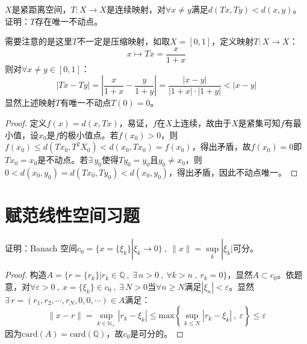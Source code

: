 \begin{example}
\quad $X$是紧距离空间，$T:X \to X$是连续映射，对$\forall x \neq y$满足$d(Tx,Ty)<d(x,y)$。证明：$T$存在唯一不动点。
\end{example}
\begin{remark}
\quad 需要注意的是这里$T$不一定是压缩映射，如取$X=[0,1]$，定义映射$T:X \to X$：
\[x \mapsto Tx=\frac{x}{1+x}\]
则对$\forall x \neq y \in [0,1]$：
\[|Tx-Ty|=\left|\frac{x}{1+x}-\frac{y}{1+y}\right|=\frac{|x-y|}{|1+x|\cdot|1+y|}<|x-y|\]
显然上述映射$T$有唯一不动点$T(0)=0$。
\end{remark}
\begin{proof}
定义$f(x)=d(x,Tx)$，易证，$f$在$X$上连续，故由于$X$是紧集可知$f$有最小值，设$x_0$是$f$的极小值点。若$f(x_0)>0$，则$f(x_0) \leq d(Tx_0,T^2X_0)<d(x_0,Tx_0)=f(x_0)$，得出矛盾，故$f(x_0)=0$即$Tx_0=x_0$是不动点。若$\exists \, y_0$使得$Ty_0=y_0$且$y_0 \neq x_0$，则$0<d(x_0,y_0)=d(Tx_0,Ty_0)<d(x_0,y_0)$，得出矛盾，因此不动点唯一。
\end{proof}

\section*{赋范线性空间习题}
\begin{example}
\quad 证明：Banach 空间$c_0=\{x=\{\xi_k\}|\xi_k\to0\} \ , \ \|x\|=\mathop \text{sup}\limits_{k}|\xi_k|$可分。
\end{example}
\begin{proof}构造$A=\{r=\{r_k\}|r_k \in \mathbb{Q} \ , \ \exists \, n>0 \ , \ \forall k>n \ , \ r_k=0\}$，显然$A \subset c_0$。依题意，对$\forall \varepsilon>0 \ , \ x=\{\xi_k\} \in c_0 \ , \ \exists \, N>0$当$\forall n \geq N$满足$|\xi_n|<\varepsilon$。显然$\exists \, r=(r_1,r_2,\cdots,r_N,0,0,\cdots) \in A$满足：
\[\|x-r\|=\mathop \text{sup}\limits_{k \in \mathbb{N}_+}|r_k-\xi_k| \leq \text{max}\left\{\mathop \text{sup}\limits_{k \leq N}|r_k-\xi_k| \ , \ \varepsilon\right\}\leq\varepsilon\]
因为$\text{card}(A)=\text{card}(\mathbb{Q})$，故$c_0$是可分的。
\end{proof}

